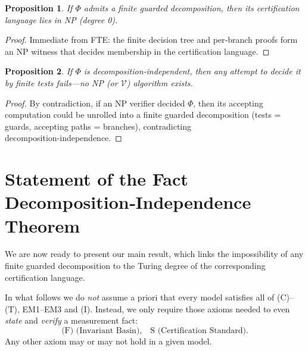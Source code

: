 \documentclass[12pt]{article}
\theoremstyle{definition}
\theoremstyle{plain}
\newtheorem{proposition}{Proposition}[section]
\begin{document}
\begin{proposition}
If $\Phi$ admits a finite guarded decomposition, then its certification language lies in NP (degree 0).
\end{proposition}
\begin{proof}
Immediate from FTE: the finite decision tree and per‑branch proofs form an NP witness that decides membership in the certification language.
\end{proof}

\begin{proposition}
If $\Phi$ is decomposition‑independent, then any attempt to decide it by finite tests fails—no NP (or \(\mathcal V\)) algorithm exists.
\end{proposition}
\begin{proof}
By contradiction, if an NP verifier decided $\Phi$, then its accepting computation could be unrolled into a finite guarded decomposition (tests = guards, accepting paths = branches), contradicting decomposition‑independence.
\end{proof}


\section{Statement of the Fact Decomposition‑Independence Theorem}

We are now ready to present our main result, which links the impossibility of any finite guarded decomposition to the Turing degree of the corresponding certification language.

In what follows we do \emph{not} assume a priori that every model satisfies all of (C)–(T), EM1–EM3 and (I).  Instead, we only require those axioms needed to even \emph{state} and \emph{verify} a measurement fact:
\[
  \text{(F) (Invariant Basin),}
  \quad
  \text{S (Certification Standard)}.
\]
Any other axiom may or may not hold in a given model.
\end{document}
